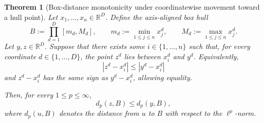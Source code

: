 \documentclass[11pt]{article}
\newtheorem{theorem}{Theorem}
\begin{document}
\begin{theorem}[Box-distance monotonicity under coordinatewise movement toward a hull point]
\label{thm:box-distance-monotonicity}
Let \(x_1,\dots,x_n\in \mathbb{R}^D\). Define the axis-aligned box hull
\[
B:=\prod_{d=1}^D [m_d,M_d],
\qquad
m_d:=\min_{1\le j\le n} x_j^d,
\qquad
M_d:=\max_{1\le j\le n} x_j^d.
\]
Let \(y,z\in \mathbb{R}^D\). Suppose that there exists some
\(i\in\{1,\dots,n\}\) such that, for every coordinate \(d\in\{1,\dots,D\}\),
the point \(z^d\) lies between \(x_i^d\) and \(y^d\). Equivalently,
\[
|z^d-x_i^d|\le |y^d-x_i^d|
\]
and \(z^d-x_i^d\) has the same sign as \(y^d-x_i^d\), allowing equality.

Then, for every \(1\le p\le \infty\),
\[
d_p(z,B)\le d_p(y,B),
\]
where \(d_p(u,B)\) denotes the distance from \(u\) to \(B\) with respect to
the \(\ell^p\)-norm.
\end{theorem}
\end{document}
